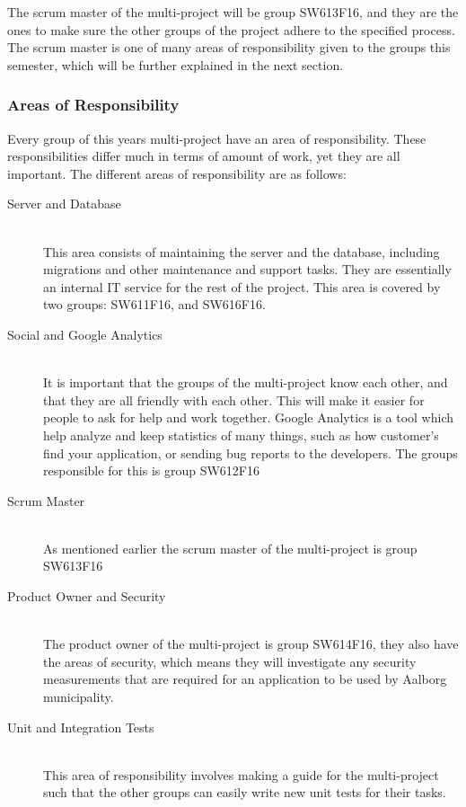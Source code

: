 The scrum master of the multi-project will be group SW613F16, and they are the ones to make sure the other groups of the project adhere to the specified process.
The scrum master is one of many areas of responsibility given to the groups this semester, which will be further explained in the next section.


\subsubsection*{Areas of Responsibility}
Every group of this years multi-project have an area of responsibility.
These responsibilities differ much in terms of amount of work, yet they are all important.
The different areas of responsibility are as follows:

\begin{description}
	\item[Server and Database] \hfill \\
	This area consists of maintaining the server and the database, including migrations and other maintenance and support tasks. They are essentially an internal IT service for the rest of the project. This area is covered by two groups: SW611F16, and SW616F16.
	\item[Social and Google Analytics] \hfill \\
	It is important that the groups of the multi-project know each other, and that they are all friendly with each other. 
	This will make it easier for people to ask for help and work together. 
	Google Analytics is a tool which help analyze and keep statistics of many things, such as how customer's find your application, or sending bug reports to the developers.
	The groups responsible for this is group SW612F16
	\item[Scrum Master] \hfill \\
	As mentioned earlier the scrum master of the multi-project is group SW613F16
	\item[Product Owner and Security] \hfill \\
	The product owner of the multi-project is group SW614F16, they also have the areas of security, which means they will investigate any security measurements that are required for an application to be used by Aalborg municipality.
	\item[Unit and Integration Tests] \hfill \\
	This area of responsibility involves making a guide for the multi-project such that the other groups can easily write new unit tests for their tasks.

\end{description}
